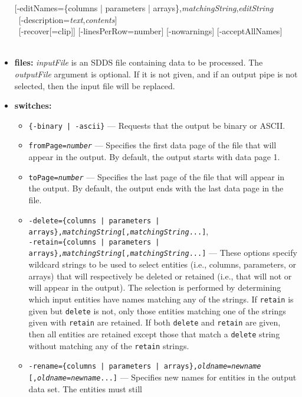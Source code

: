 \begin{itemize}
\begin{flushleft}
{[-editNames=\{columns | parameters | arrays\},{\em matchingString},{\em editString} \\ \ 
[-description={\em text},{\em contents}] \\ \ 
[-recover[=clip]] [-linesPerRow={\rm number}] [-nowarnings] [-acceptAllNames]\\ \ 
}\end{flushleft}
\item {\bf files:}
{\em inputFile} is an SDDS file containing data to be processed.  The {\em outputFile} argument is
optional.  If it is not given, and if an output pipe is not selected, then the input file will be
replaced.
\item {\bf switches:}
    \begin{itemize}
    \item {\tt \{-binary | -ascii\}} --- Requests that the output be binary or ASCII.
    \item {\tt fromPage={\em number}} --- Specifies the first data page of the file that will appear in the output.
        By default, the output starts with data page 1.
    \item {\tt toPage={\em number}} --- Specifies the last page of the file that will appear in the output.
        By default, the output ends with the last data page in the file.
    \item {\tt -delete=\{columns | parameters | arrays\},{\em matchingString}[,{\em matchingString}...]},\\
        {\tt -retain=\{columns | parameters | arrays\},{\em matchingString}[,{\em matchingString}...]}
         --- These options specify wildcard strings to be used to select entities
        (i.e., columns, parameters, or arrays) that will respectively be deleted or retained (i.e., that will not or
        will appear in the output).   
        The selection is performed by determining which input entities have names matching any of the strings.
        If \verb|retain| is given but \verb|delete| is not, only those entities matching one of the
        strings given with \verb|retain| are retained.  If both \verb|delete| and \verb|retain|
        are given, then all entities are retained except those that match a \verb|delete| string without
        matching any of the \verb|retain| strings.
    \item {\tt -rename=\{columns | parameters | arrays\},{\em oldname}={\em newname}}\\
        {\tt [,{\em oldname}={\em newname}...]} 
        --- Specifies new names for entities in the output data set.  The entities must still

\end{itemize}
\end{itemize}
